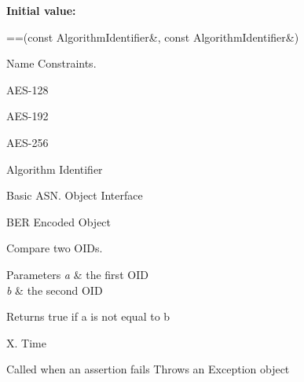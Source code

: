 {\bfseries Initial value\+:}
\begin{DoxyCode}
==(\textcolor{keyword}{const} AlgorithmIdentifier&,
                                      \textcolor{keyword}{const} AlgorithmIdentifier&)
\end{DoxyCode}


Name Constraints. 

A\+E\+S-\/128

A\+E\+S-\/192

A\+E\+S-\/256

Algorithm Identifier

Basic A\+S\+N. Object Interface

B\+ER Encoded Object

Compare two O\+I\+Ds. 
\begin{DoxyParams}{Parameters}
{\em a} & the first O\+ID \\
\hline
{\em b} & the second O\+ID \\
\hline
\end{DoxyParams}
\begin{DoxyReturn}{Returns}
true if a is not equal to b
\end{DoxyReturn}
X. Time

Called when an assertion fails Throws an Exception object

